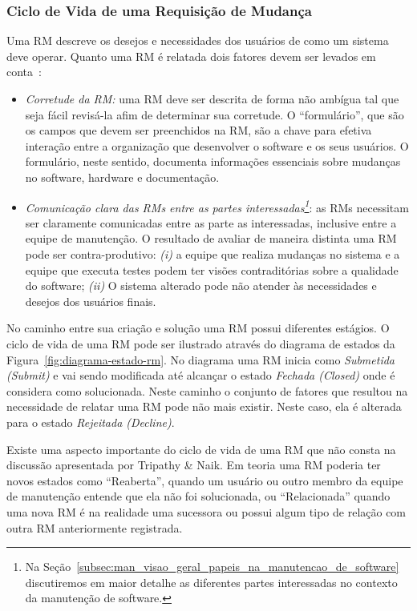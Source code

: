 \subsubsection{Ciclo de Vida de uma Requisição de Mudança}
\label{sub:fluxo_de_trabalho_requisicao_mudanca}

Uma RM descreve os desejos e necessidades dos usuários de como um sistema deve
operar. Quanto uma RM é relatada dois fatores devem ser levados em
conta~\cite{tripathy2014software}:

\begin{itemize}
	\item \textit{Corretude da RM:} uma RM deve ser descrita de forma não
		ambígua tal que seja fácil revisá-la afim de determinar sua corretude. O
		``formulário'', que são os campos que devem ser preenchidos na RM, são a
		chave para efetiva interação entre a organização que desenvolver o
		software e os seus usuários. O formulário, neste sentido, documenta
		informações essenciais sobre mudanças no software, hardware e
		documentação.
   \item \textit{Comunicação clara das RMs entre as partes
           interessadas\footnote{Na
               Seção~\ref{subsec:man_visao_geral_papeis_na_manutencao_de_software}
               discutiremos em maior detalhe as diferentes partes interessadas
               no contexto da manutenção de software.}}: as RMs necessitam ser
       claramente comunicadas entre as parte as interessadas, inclusive entre a
       equipe de manutenção. O resultado de avaliar de maneira distinta uma RM
       pode ser contra-produtivo: \textit{(i)} a equipe que realiza mudanças no
       sistema e a equipe que executa testes podem ter visões contraditórias
       sobre a qualidade do software; \textit{(ii)} O sistema alterado pode não
       atender às necessidades e desejos dos usuários finais.
\end{itemize}

No caminho entre sua criação e solução uma RM possui diferentes estágios. O
ciclo de vida de uma RM pode ser ilustrado através do diagrama de estados da
Figura~\ref{fig:diagrama-estado-rm}. No diagrama uma RM inicia como
\textit{Submetida (Submit)} e vai sendo modificada até alcançar o estado
\textit{Fechada (Closed)} onde é considera como solucionada. Neste caminho o
conjunto de fatores que resultou na necessidade de relatar uma RM pode não mais
existir. Neste caso, ela é alterada para o estado \textit{Rejeitada (Decline)}.

Existe uma aspecto importante do ciclo de vida de uma RM que não consta na
discussão apresentada por Tripathy \& Naik. Em teoria uma RM poderia ter novos
estados como ``Reaberta'', quando um usuário ou outro membro da equipe de
manutenção entende que ela não foi solucionada, ou ``Relacionada'' quando uma
nova RM é na realidade uma sucessora ou possui algum tipo de relação com outra
RM anteriormente registrada.

